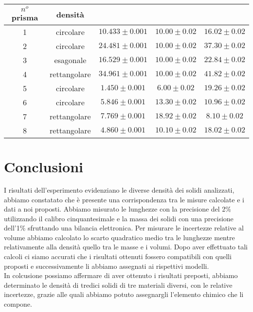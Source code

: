 \documentclass[8pt]{article}
\begin{document}
\begin{center}
\begin{tabular}{ c c c c c }
\toprule
$n^o$ prisma & densità\\
\midrule
1 & circolare & $10.433 \pm 0.001$ & $10.00 \pm 0.02$ & $16.02 \pm 0.02$ \\
2 & circolare & $24.481 \pm 0.001$ & $10.00 \pm 0.02$ & $37.30 \pm 0.02$\\
3 & esagonale & $16.529 \pm 0.001$ & $10.00 \pm 0.02$ & $22.84 \pm 0.02$ \\
4 & rettangolare & $34.961 \pm 0.001$ & $10.00 \pm 0.02$ & $41.82 \pm 0.02$  \\
5 & circolare & $1.450 \pm 0.001$ & $6.00 \pm 0.02$ & $19.26 \pm 0.02$  \\
6 & circolare & $5.846 \pm 0.001$ & $13.30 \pm 0.02$ & $10.96 \pm 0.02$  \\
7 & rettangolare & $7.769 \pm 0.001$ & $18.92 \pm 0.02$ & $8.10 \pm 0.02$  \\
8 & rettangolare & $4.860 \pm 0.001$ & $10.10 \pm 0.02$ & $18.02 \pm 0.02$  \\
\bottomrule
\end{tabular}
\end{center}

\pagebreak

\section{Conclusioni}
I risultati dell'esperimento evidenziano le diverse densità dei solidi analizzati, abbiamo constatato che è presente una corrispondenza tra le misure calcolate e i dati a noi proposti. Abbiamo misurato le lunghezze con la precisione del 2\% utilizzando il calibro cinquantesimale e la massa dei solidi con una precisione dell'1\% sfruttando una bilancia elettronica. Per misurare le incertezze relative al volume abbiamo calcolato lo scarto quadratico medio tra le lunghezze mentre relativamente alla densità quello tra le masse e i volumi.  Dopo aver effettuato tali calcoli ci siamo accurati che i risultati ottenuti fossero compatibili con quelli proposti e successivamente li abbiamo assegnati ai rispettivi modelli.\\ In colcusione possiamo affermare di aver ottenuto i risultati preposti, abbiamo determinato le densità di tredici solidi di tre materiali diversi, con le relative incertezze, grazie alle quali abbiamo potuto assegnargli l'elemento chimico che li compone.
\end{document}
